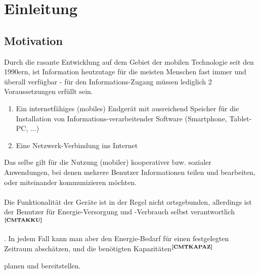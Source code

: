 %
%
\section{Einleitung}


\subsection{Motivation}
Durch die rasante Entwicklung auf dem Gebiet der mobilen Technologie seit den 1990ern, ist Information heutzutage für die meisten Menschen fast immer und überall verfügbar - für den Informations-Zugang müssen lediglich 2 Voraussetzungen erfüllt sein.
\begin{enumerate}
\item Ein internetfähiges (mobiles) Endgerät mit ausreichend Speicher für die Installation von Informations-verarbeitender Software (Smartphone, Tablet-PC,  ...)
\item Eine Netzwerk-Verbindung ins Internet
\end{enumerate}
Das selbe gilt für die Nutzung (mobiler) kooperativer bzw. sozialer Anwendungen, bei denen mehrere Benutzer Informationen teilen und bearbeiten, oder miteinander kommunizieren möchten.\\ \\
\noindent
Die Funktionalität der Geräte ist in der Regel nicht ortsgebunden, allerdings ist der Benutzer für Energie-Versorgung und -Verbrauch selbst verantwortlich$^{\textbf{\ref{CMTAKKU}}}$%
\addtocounter{footnote}{1}%
. In jedem Fall kann man aber den Energie-Bedarf für einen festgelegten Zeitraum abschätzen, und die benötigten Kapazitäten$^{\textbf{\ref{CMTKAPAZ}}}$%
\addtocounter{footnote}{1}%
 planen und bereitstellen.\\ \\
